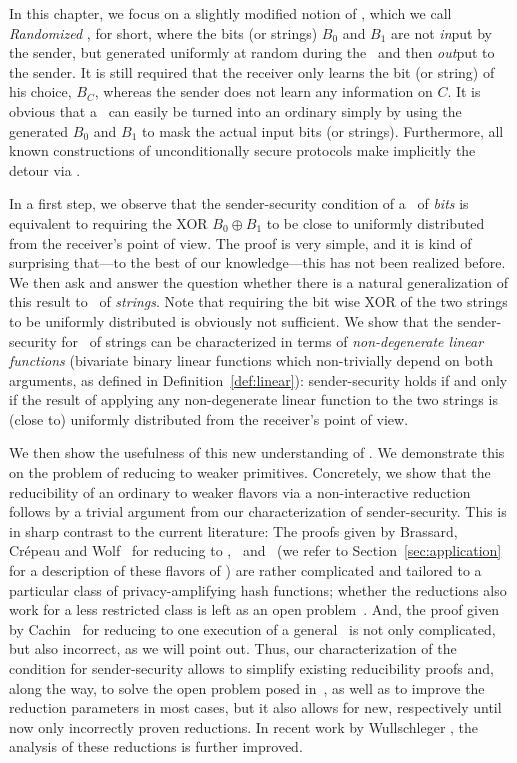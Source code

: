 In this chapter, we focus on a slightly modified notion of \OT, which we
call {\em Randomized} \OT, \RandOT for short, where the bits (or
strings) $B_0$ and $B_1$ are not {\em in}put by the sender, but
generated uniformly at random during the \RandOT\ and then {\em
  out}put to the sender. It is still required that the receiver only
learns the bit (or string) of his choice, $B_C$, whereas the sender
does not learn any information on $C$. It is obvious that a \RandOT\ 
can easily be turned into an ordinary \OT simply by using the
generated $B_0$ and $B_1$ to mask the actual input bits (or strings).
Furthermore, all known constructions of unconditionally secure \OT 
protocols make implicitly the detour via \RandOT.

In a first step, we observe that the sender-security condition of a
\RandOT\ of {\em bits} is equivalent to requiring the XOR $B_0 \oplus
B_1$ to be close to uniformly distributed from the receiver's point of
view. The proof is very simple, and it is kind of surprising that---to
the best of our knowledge---this has not been realized before. We then
ask and answer the question whether there is a natural generalization
of this result to \RandOT\ of {\em strings}. Note that requiring the
bit wise XOR of the two strings to be uniformly distributed is
obviously not sufficient. We show that the sender-security for \RandOT\ of
strings can be characterized in terms of {\em non-degenerate linear
  functions} (bivariate binary linear functions which non-trivially
depend on both arguments, as defined in Definition~\ref{def:linear}):
sender-security holds if and only if the result of applying any
non-degenerate linear function to the two strings is (close to)
uniformly distributed from the receiver's point of view.

We then show the usefulness of this new understanding of \OT. We
demonstrate this on the problem of reducing \OT to weaker primitives.
Concretely, we show that the reducibility of an ordinary \OT to weaker
flavors via a non-interactive reduction follows by a trivial argument
from our characterization of sender-security.  This is in sharp
contrast to the current literature: The proofs given by Brassard,
Cr\'epeau and Wolf~\cite{BC97,Wolf00,BCW03} for reducing \OT to
\XOT, \GOT\ and \BUOT\ (we refer to Section~\ref{sec:application} for
a description of these flavors of \pOT) are rather complicated and
tailored to a particular class of privacy-amplifying hash functions;
whether the reductions also work for a less restricted class is left
as an open problem~\cite[page~222]{BCW03}. And, the proof given by
Cachin~\cite{Cachin98} for reducing \OT to one execution of a
general \pUOT\ is not only complicated, but also incorrect, as we will
point out.  Thus, our characterization of the condition for
sender-security allows to simplify existing reducibility proofs and,
along the way, to solve the open problem posed in~\cite{BCW03}, as
well as to improve the reduction parameters in most cases, but it also
allows for new, respectively until now only incorrectly proven
reductions. In recent work by Wullschleger \cite{Wullschleger07}, the
analysis of these reductions is further improved.

